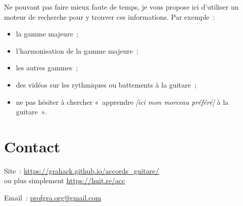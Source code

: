 \documentclass[11pt]{article}
\begin{document}
Ne pouvant pas faire mieux faute de temps, je vous propose ici d’utiliser un
moteur de recherche pour y trouver ces informations. Par exemple~:

\begin{itemize}
\item la gamme majeure~;
\item l’harmonisation de la gamme majeure~;
\item les autres gammes~;
\item des vidéos sur les rythmiques ou battements à la guitare~;
\item ne pas hésiter à chercher «~apprendre \textit{[ici mon morceau préféré]}
       à la guitare~».
\end{itemize}

\section{Contact} \label{contact}

\setlength{\parindent}{0pt}

Site~: \url{https://grahack.github.io/accords_guitare/} \\
ou plus simplement \url{https://huit.re/acc}

Email~: \url{profgra.org@gmail.com}
\end{document}
